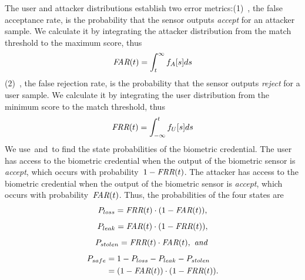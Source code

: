 \documentclass[conference,compsoc]{IEEEtran}
\begin{document}
The user and attacker distributions establish two error metrics:(1)~\FAR, the false acceptance rate, is the probability that the sensor outputs \emph{accept} for an attacker sample. We calculate it by integrating the attacker distribution from the match threshold to the maximum score, thus
\begin{equation}
    \label{eqn:FAR}
\textit{FAR}(t) = \int_{t}^{\infty} f_A[s] ds
\end{equation}
(2)~\FRR, the false rejection rate, is the probability that the sensor outputs \emph{reject} for a user sample. We calculate it by integrating the user distribution from the minimum score to the match threshold, thus
\begin{equation}
    \label{eqn:FRR}
\textit{FRR}(t) = \int_{-\infty}^{t} f_U[s] ds
\end{equation}
We use~\FAR and~\FRR to find the state probabilities of the biometric credential. The user has access to the biometric credential when the output of the biometric sensor is \emph{accept}, which occurs with probability~$1-\textit{FRR}(t)$. The attacker has access to the biometric credential when the output of the biometric sensor is \emph{accept}, which occurs with probability~$\textit{FAR}(t)$. Thus, the probabilities of the four states are
\begin{equation*}
    P_{loss} = \textit{FRR}(t) \cdot (1 - \textit{FAR}(t)),
\end{equation*}
\begin{equation*}
P_{leak} = \textit{FAR}(t) \cdot (1 - \textit{FRR}(t)),
\end{equation*}
\begin{equation*}
P_{stolen} = \textit{FRR}(t) \cdot \textit{FAR}(t), \textit{ and }
\end{equation*}
\begin{align}
P_{safe} &= 1-P_{loss}-P_{leak}-P_{stolen} \notag \\
&= (1 - \textit{FAR}(t)) \cdot (1 - \textit{FRR}(t)). \label{eqn:safe_prob}
\end{align}

\end{document}
